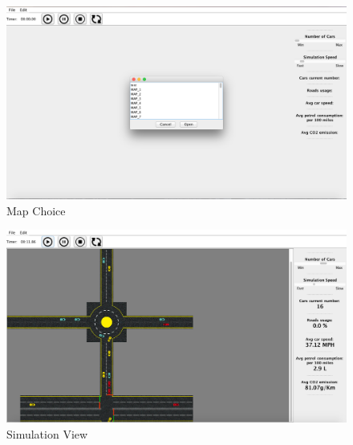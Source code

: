 \begin{figure}[h2] 
\centering \includegraphics[width=6in]{img4}
\caption{Map Choice} 
\end{figure}

\begin{figure}[h2] 
\centering \includegraphics[width=6in]{img5}
\caption{Simulation View} 
\end{figure}